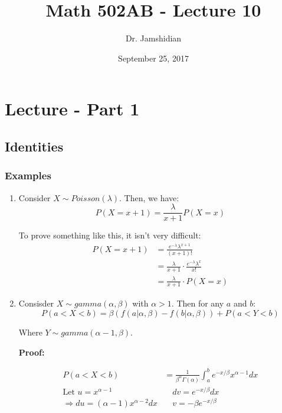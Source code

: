 \documentclass{article}
\title{Math 502AB - Lecture 10}
\author{Dr. Jamshidian}
\date{September 25, 2017}
\begin{document}
\maketitle

\section{Lecture - Part 1}

\subsection{Identities}

\subsubsection*{Examples}
\begin{enumerate}
    \item Consider $X \sim Poisson(\lambda)$. Then, we have:
    \begin{equation*}
        P(X=x+1) = \frac{\lambda}{x+1} P(X=x)
    \end{equation*}

    To prove something like this, it isn't very difficult:
    \begin{equation*}
        \begin{split}
            P(X=x+1) &= \frac{e^{-\lambda} \lambda^{x+1}}{(x+1)!}\\
                &= \frac{\lambda}{x+1} \cdot \frac{e^{-\lambda}\lambda^x}{x!}\\
                &= \frac{\lambda}{x+1}\cdot P(X=x)
        \end{split}
    \end{equation*}
    \item Consisder $X \sim gamma(\alpha,\beta)$ with $\alpha > 1$. Then for any $a$ and $b$:
    \begin{equation*}
        P(a < X < b) = \beta\left(f(a|\alpha,\beta) - f(b|\alpha,\beta) \right) + P(a< Y < b)
    \end{equation*}

    Where $Y \sim gamma(\alpha-1,\beta)$.

    \noindent \textbf{Proof:}

    \begin{equation*}
        \begin{split}
            P(a < X < b) &= \frac{1}{\beta^\alpha \Gamma(\alpha)} \int_a^b e^{-x/\beta} x^{\alpha-1} dx\\
            \text{Let } u = x^{\alpha - 1} &\quad dv = e^{-x/\beta}dx\\
            \Rightarrow du = (\alpha-1) x^{\alpha-2}dx &\quad v = -\beta e^{-x/\beta}
        \end{split}
    \end{equation*}


\end{enumerate}
\end{document}
